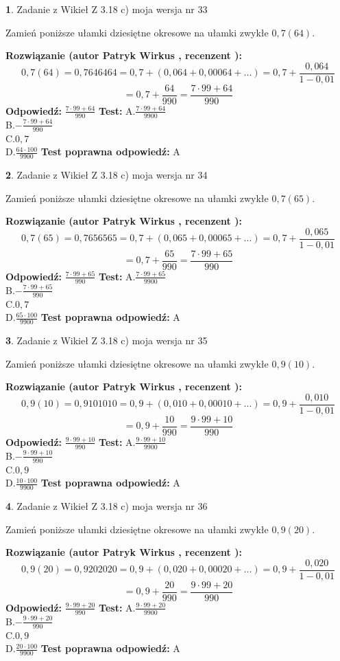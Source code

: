 \documentclass[12pt, a4paper]{article}
\theoremstyle{definition} %
\newtheorem{zad}{}
\newcommand{\zadStart}[1]{\begin{zad}#1\newline}
\newcommand{\zadStop}{\end{zad}}
\newcommand{\rozwStart}[2]{\noindent \textbf{Rozwiązanie (autor #1 , recenzent #2): }\newline}
\newcommand{\rozwStop}{\newline}
\newcommand{\odpStart}{\noindent \textbf{Odpowiedź:}\newline}
\newcommand{\odpStop}{\newline}
\newcommand{\testStart}{\noindent \textbf{Test:}\newline}
\newcommand{\testStop}{\newline}
\newcommand{\kluczStart}{\noindent \textbf{Test poprawna odpowiedź:}\newline}
\newcommand{\kluczStop}{\newline}
\begin{document}
\zadStart{Zadanie z Wikieł Z 3.18 c) moja wersja nr 33}

Zamień poniższe ułamki dziesiętne okresowe na ułamki zwykłe $0,7(64)$.
\zadStop
\rozwStart{Patryk Wirkus}{}
$$0,7(64)=0,7646464=0,7+(0,064+0,00064+...)=0,7+\frac{0,064}{1-0,01}$$
$$=0,7+\frac{64}{990}=\frac{7\cdot99+64}{990}$$
\rozwStop
\odpStart
$\frac{7\cdot99+64}{990}$
\odpStop
\testStart
A.$\frac{7\cdot99+64}{9900}$\\ B.$-\frac{7\cdot99+64}{990}$\\ C.$0,7$\\ D.$\frac{64\cdot100}{9900}$
\testStop
\kluczStart
A
\kluczStop



\zadStart{Zadanie z Wikieł Z 3.18 c) moja wersja nr 34}

Zamień poniższe ułamki dziesiętne okresowe na ułamki zwykłe $0,7(65)$.
\zadStop
\rozwStart{Patryk Wirkus}{}
$$0,7(65)=0,7656565=0,7+(0,065+0,00065+...)=0,7+\frac{0,065}{1-0,01}$$
$$=0,7+\frac{65}{990}=\frac{7\cdot99+65}{990}$$
\rozwStop
\odpStart
$\frac{7\cdot99+65}{990}$
\odpStop
\testStart
A.$\frac{7\cdot99+65}{9900}$\\ B.$-\frac{7\cdot99+65}{990}$\\ C.$0,7$\\ D.$\frac{65\cdot100}{9900}$
\testStop
\kluczStart
A
\kluczStop



\zadStart{Zadanie z Wikieł Z 3.18 c) moja wersja nr 35}

Zamień poniższe ułamki dziesiętne okresowe na ułamki zwykłe $0,9(10)$.
\zadStop
\rozwStart{Patryk Wirkus}{}
$$0,9(10)=0,9101010=0,9+(0,010+0,00010+...)=0,9+\frac{0,010}{1-0,01}$$
$$=0,9+\frac{10}{990}=\frac{9\cdot99+10}{990}$$
\rozwStop
\odpStart
$\frac{9\cdot99+10}{990}$
\odpStop
\testStart
A.$\frac{9\cdot99+10}{9900}$\\ B.$-\frac{9\cdot99+10}{990}$\\ C.$0,9$\\ D.$\frac{10\cdot100}{9900}$
\testStop
\kluczStart
A
\kluczStop



\zadStart{Zadanie z Wikieł Z 3.18 c) moja wersja nr 36}

Zamień poniższe ułamki dziesiętne okresowe na ułamki zwykłe $0,9(20)$.
\zadStop
\rozwStart{Patryk Wirkus}{}
$$0,9(20)=0,9202020=0,9+(0,020+0,00020+...)=0,9+\frac{0,020}{1-0,01}$$
$$=0,9+\frac{20}{990}=\frac{9\cdot99+20}{990}$$
\rozwStop
\odpStart
$\frac{9\cdot99+20}{990}$
\odpStop
\testStart
A.$\frac{9\cdot99+20}{9900}$\\ B.$-\frac{9\cdot99+20}{990}$\\ C.$0,9$\\ D.$\frac{20\cdot100}{9900}$
\testStop
\kluczStart
A
\kluczStop
\end{document}
